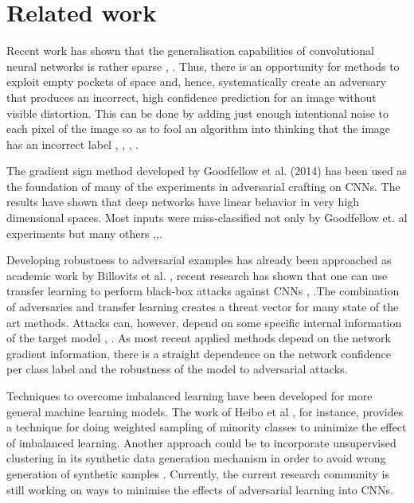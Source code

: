 \documentclass[runningheads,a4paper]{llncs}
\begin{document}
\section{Related work}


Recent work has shown that the generalisation capabilities of convolutional neural networks \cite{lawrence1997face} is rather sparse \cite{goodfellow2016}, \cite{papernot2016transf}. Thus, there is an opportunity for methods to exploit empty pockets of space and, hence, systematically create an adversary that produces an incorrect, high confidence prediction for an image without visible distortion. This can be done by adding just enough intentional noise to each pixel of the image so as to fool an algorithm into thinking that the image has an incorrect label \cite{goodfellow2014}, \cite{goodfellow2016}, \cite{papernot2016transf}, \cite{szegedy2013}.

The gradient sign method developed by Goodfellow et al. (2014) has been used as the foundation of many of the experiments in adversarial crafting on CNNs. The results have shown that deep networks have linear behavior in very high dimensional spaces.  Most inputs were miss-classified not only by Goodfellow et. al \cite{goodfellow2014}  experiments but many others \cite{billovits},\cite{goodfellow2016},\cite{papernot2016}.

Developing robustness to adversarial examples has already been approached as academic work by Billovits et al. \cite{billovits}, recent research has shown that one can use transfer learning to perform black-box attacks against CNNs \cite{yosinski2014transferable} , \cite{papernot2016} .The combination of adversaries and transfer learning creates a threat vector for many state of the art methods. Attacks can, however, depend on some specific internal information of the target model \cite{lowd2005}, \cite{papernot2016transf}. As most recent applied methods depend on the network gradient information, there is a straight dependence on the network confidence per class label and the robustness of the model to adversarial attacks.

Techniques to overcome imbalanced learning have been developed for more general machine learning models. The work of Heibo et al \cite{he2008adasyn}, for instance, provides a technique for doing weighted sampling of minority classes to minimize the effect of imbalanced learning. Another approach could be to incorporate unsupervised clustering in its synthetic data generation mechanism in order to avoid wrong generation of synthetic samples \cite{Barua2011}. Currently, the current research community is still working on ways to minimise the effects of adversarial learning into CNNs.
\end{document}
